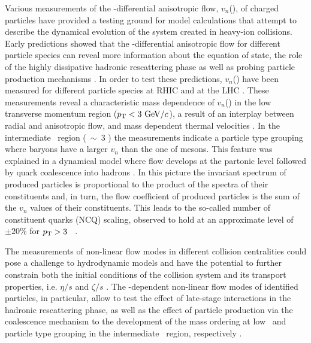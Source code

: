 Various measurements of the \pT-differential anisotropic flow, $v_{n}$(\pT), of charged particles \cite{Voloshin:2008dg, ALICE:2011ab, ATLAS:2012at, Chatrchyan:2013kba, Acharya:2018lmh,Acharya:2018ihu} have provided a testing ground for model calculations that attempt to describe the dynamical evolution of the system created in heavy-ion collisions. Early predictions showed that the \pT-differential anisotropic flow for different particle species can reveal more information about the equation of state, the role of the highly dissipative hadronic rescattering phase as well as probing particle production mechanisms \cite{Voloshin:1996nv,Huovinen:2001cy}. In order to test these predictions, $v_{n}$(\pT) have been measured for different particle species at RHIC \cite{Adams:2003am,Abelev:2007qg,Adler:2003kt,Adare:2006ti} and at the LHC \cite{Abelev:2014pua,Adam:2015eta,Adam:2016nfo,Acharya:2018zuq}. These measurements reveal a characteristic mass dependence of $v_{n}$(\pT) in the low transverse momentum region ($p_{\rm{T}} < 3~{\rm GeV}/c$), a result of an interplay between radial and anisotropic flow, and mass dependent thermal velocities \cite{Voloshin:1996nv,Huovinen:2001cy}. 
In the intermediate \pT~region (\pT~$\sim$~3 \GeV) the measurements indicate a particle type grouping where baryons have a larger $v_{n}$ than the one of mesons. This feature was explained in a dynamical model where flow develops at the partonic level followed by quark coalescence into hadrons \cite{Voloshin:2002wa,Molnar:2003ff}. In this picture the invariant spectrum of produced particles is proportional to the product of the spectra of their constituents and, in turn, the flow coefficient of produced particles is the sum of the $v_{n}$ values of their constituents. This leads to the so-called number of constituent quarks (NCQ) scaling, observed to hold at an approximate level of $\pm20$\% for $p_{\rm{T}} > 3$ \GeV~\cite{Adare:2006ti,Adare:2012vq,Abelev:2014pua,Adam:2016nfo}.

The measurements of non-linear flow modes in different collision centralities could pose a challenge to hydrodynamic models and have the potential to further constrain both the initial conditions of the collision system and its transport properties, i.e. $\eta/s$ and $\zeta/s$ \cite{Zhu:2016puf, Acharya:2017zfg}. The \pT-dependent non-linear flow modes of identified particles, in particular, allow to test the effect of late-stage interactions in the hadronic rescattering phase, as well as the effect of particle production via the coalescence mechanism to the development of the mass ordering at low \pT~and particle type grouping in the intermediate \pT~region, respectively \cite{ALICE:2011ab,Acharya:2018zuq}.


